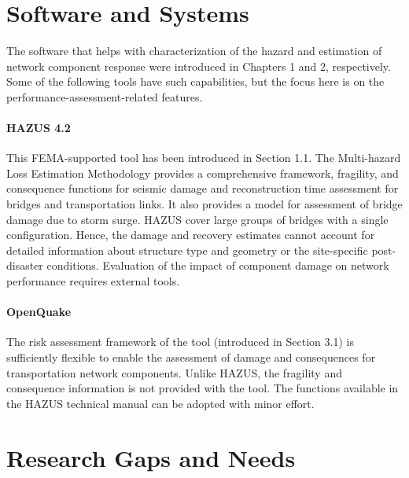 \section{Software and Systems}
\label{sec:perf_transport_tools}

The software that helps with characterization of the hazard and estimation of network component response were introduced in Chapters 1 and 2, respectively. Some of the following tools have such capabilities, but the focus here is on the performance-assessment-related features.

\paragraph{HAZUS 4.2} This FEMA-supported tool has been introduced in Section 1.1. The  Multi-hazard Loss Estimation Methodology provides a comprehensive framework, fragility, and consequence functions for seismic damage and reconstruction time assessment for bridges and transportation links. It also provides a model for assessment of bridge damage due to storm surge. HAZUS cover large groups of bridges with a single configuration. Hence, the damage and recovery estimates cannot account for detailed information about structure type and geometry or the site-specific post-disaster conditions. Evaluation of the impact of component damage on network performance requires external tools.

\paragraph{OpenQuake} The risk assessment framework of the  tool (introduced in Section 3.1) is sufficiently flexible to enable the assessment of damage and consequences for transportation network components. Unlike HAZUS, the fragility and consequence information is not provided with the tool. The functions available in the HAZUS technical manual \citep{division2018hazusa} can be adopted with minor effort.

\section{Research Gaps and Needs}
\label{sec:perf_transport_gaps}

